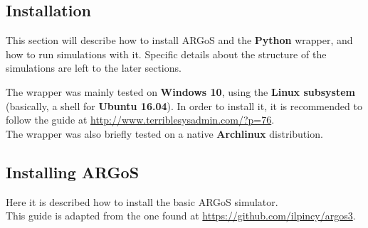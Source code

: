 \documentclass[
12pt,
a4paper,
oneside,
headinclude,
footinclude]{article}
\theoremstyle{definition} %
\begin{document}
\subsection{Installation}
This section will describe how to install ARGoS and the \textbf{Python} wrapper, and how to run simulations with it. Specific details about the structure of the simulations are left to the later sections.

The wrapper was mainly tested on \textbf{Windows 10}, using the \textbf{Linux subsystem} (basically, a shell for \textbf{Ubuntu 16.04}). In order to install it, it is recommended to follow the guide at \href{http://www.terriblesysadmin.com/?p=76}{http://www.terriblesysadmin.com/?p=76}.\\
The wrapper was also briefly tested on a native \textbf{Archlinux} distribution.

\subsection{Installing ARGoS}
Here it is described how to install the basic ARGoS simulator.\\
This guide is adapted from the one found at \href{https://github.com/ilpincy/argos3}{https://github.com/ilpincy/argos3}.
\end{document}
